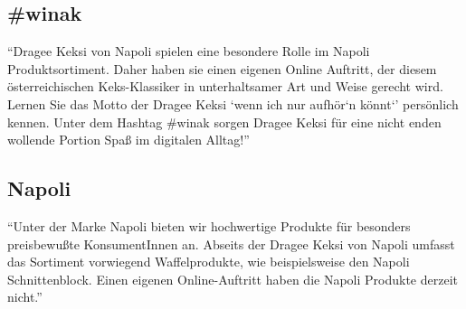\subsection{\#winak}
\enquote{Dragee Keksi von Napoli spielen eine besondere Rolle im Napoli Produktsortiment. Daher haben sie einen eigenen Online Auftritt, der diesem österreichischen Keks-Klassiker in unterhaltsamer Art und Weise gerecht wird.
Lernen Sie das Motto der Dragee Keksi \enquote{wenn ich nur aufhör`n könnt`} persönlich kennen. Unter dem Hashtag \#winak sorgen Dragee Keksi für eine nicht enden wollende Portion Spaß im digitalen Alltag!}\cite{josef_manner_marken}

\subsection{Napoli}
\enquote{Unter der Marke Napoli bieten wir hochwertige Produkte für besonders preisbewußte KonsumentInnen an. Abseits der Dragee Keksi von Napoli umfasst das Sortiment vorwiegend Waffelprodukte, wie beispielsweise den Napoli Schnittenblock. Einen eigenen Online-Auftritt haben die Napoli Produkte derzeit nicht.}\cite{josef_manner_marken}
